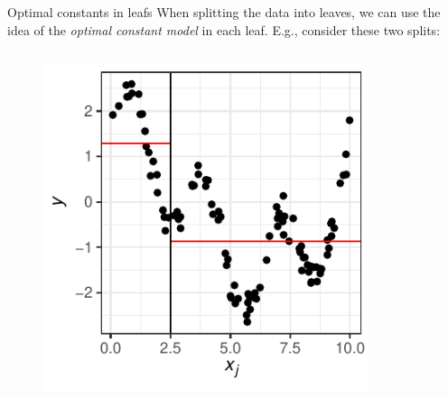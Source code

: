 \documentclass[11pt,compress,t,notes=noshow, xcolor=table]{beamer}
\begin{document}
\begin{vbframe}{Optimal constants in leafs}
When splitting the data into leaves, we can use the idea of the \emph{optimal constant model} in each leaf. E.g., consider these two splits:

\begin{columns}
\begin{column}{0.5\textwidth}

\color{fgcolor}

\begin{figure}
\includegraphics[width=0.9\textwidth]{figure/splitcrit_optimal-constant-sub1.pdf} 
\end{figure}

 
\end{column}
\begin{column}{0.5\textwidth}


\end{column}
\end{columns}
\end{vbframe}
\end{document}
